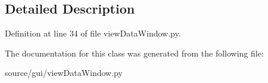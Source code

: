 \subsection{Detailed Description}


Definition at line 34 of file view\+Data\+Window.\+py.



The documentation for this class was generated from the following file\+:\begin{DoxyCompactItemize}
\item 
source/gui/view\+Data\+Window.\+py\end{DoxyCompactItemize}
